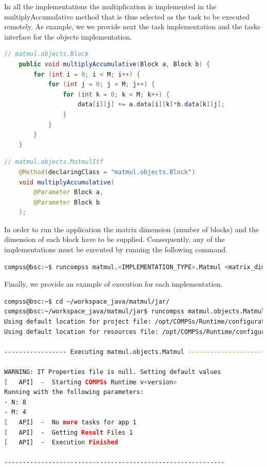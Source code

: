 \newpage 
In all the implementations the multiplication is implemented in the multiplyAccumulative method that is thus selected as the task to be executed remotely.
As example, we we provide next the task implementation and the tasks interface for the objects implementation.

\begin{lstlisting}[language=java]
	// matmul.objects.Block
	public void multiplyAccumulative(Block a, Block b) {
		for (int i = 0; i < M; i++) {
			for (int j = 0; j < M; j++) {
				for (int k = 0; k < M; k++) {
					data[i][j] += a.data[i][k]*b.data[k][j];
				}
			}
		}
	}
\end{lstlisting}

\begin{lstlisting}[language=java]
	// matmul.objects.MatmulItf
	@Method(declaringClass = "matmul.objects.Block")
	void multiplyAccumulative(
		@Parameter Block a,
		@Parameter Block b
	);
\end{lstlisting}

In order to run the application the matrix dimension (number of blocks) and the dimension of each block have to be supplied. Consequently, any of the 
implementations must be executed by running the following command.
\begin{lstlisting}[language=bash]
compss@bsc:~$ runcompss matmul.<IMPLEMENTATION_TYPE>.Matmul <matrix_dim> <block_dim>
\end{lstlisting}

Finally, we provide an example of execution for each implementation.

\begin{lstlisting}[language=bash]
compss@bsc:~$ cd ~/workspace_java/matmul/jar/
compss@bsc:~/workspace_java/matmul/jar$ runcompss matmul.objects.Matmul 8 4
Using default location for project file: /opt/COMPSs/Runtime/configuration/xml/projects/project.xml
Using default location for resources file: /opt/COMPSs/Runtime/configuration/xml/resources/resources.xml

----------------- Executing matmul.objects.Matmul --------------------------

WARNING: IT Properties file is null. Setting default values
[   API]  -  Starting COMPSs Runtime v<version>
Running with the following parameters:
- N: 8
- M: 4
[   API]  -  No more tasks for app 1
[   API]  -  Getting Result Files 1
[   API]  -  Execution Finished

------------------------------------------------------------
\end{lstlisting}

